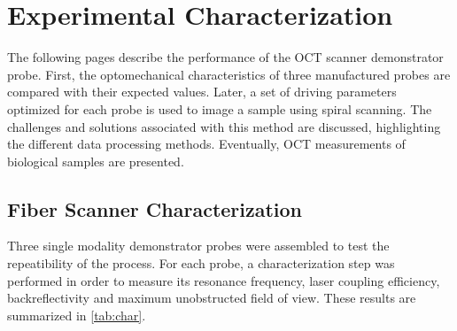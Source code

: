 %
%
\chapter{Experimental Characterization}
\label{Ch:Measurements}	

The following pages describe the performance of the OCT scanner demonstrator probe. First, the optomechanical characteristics of three manufactured probes are compared with their expected values. Later, a set of driving parameters optimized for each probe is used to image a sample using spiral scanning. The challenges and solutions associated with this method are discussed, highlighting the different data processing methods. Eventually, OCT measurements of biological samples are presented.

\section{Fiber Scanner Characterization}

Three single modality demonstrator probes were assembled to test the repeatibility of the process.  For each probe, a characterization step was performed in order to measure its resonance frequency, laser coupling efficiency, backreflectivity and maximum unobstructed field of view. These results are summarized in \autoref{tab:char}.

